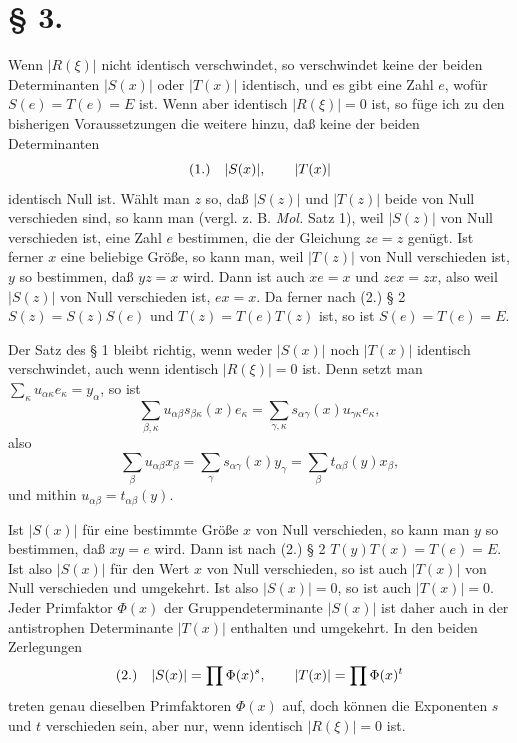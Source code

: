 \documentclass[11pt]{article}
\newcommand{\fnum}[1]{\textup{(\ensuremath{#1}.)}\quad}
\begin{document}
\section*{§ 3.}

Wenn $|R(\xi)|$ nicht identisch verschwindet, so verschwindet keine der beiden Determinanten $|S(x)|$ oder $|T(x)|$ identisch, und es gibt eine Zahl $e$, wofür $S(e)=T(e)=E$ ist. Wenn aber identisch $|R(\xi)|=0$ ist, so füge ich zu den bisherigen Voraussetzungen die weitere hinzu, daß keine der beiden Determinanten
\[
\fnum{1} |S(x)|,\qquad |T(x)|
\]
identisch Null ist. Wählt man $z$ so, daß $|S(z)|$ und $|T(z)|$ beide von Null verschieden sind, so kann man (vergl. z. B. \emph{Mol.} Satz 1), weil $|S(z)|$ von Null verschieden ist, eine Zahl $e$ bestimmen, die der Gleichung $ze=z$ genügt. Ist ferner $x$ eine beliebige Größe, so kann man, weil $|T(z)|$ von Null verschieden ist, $y$ so bestimmen, daß $yz=x$ wird. Dann ist auch $xe=x$ und $zex=zx$, also weil $|S(z)|$ von Null verschieden ist, $ex=x$. Da ferner nach (2.) § 2 $S(z)=S(z)S(e)$ und $T(z)=T(e)T(z)$ ist, so ist $S(e)=T(e)=E$.

Der Satz des § 1 bleibt richtig, wenn weder $|S(x)|$ noch $|T(x)|$ identisch verschwindet, auch wenn identisch $|R(\xi)|=0$ ist. Denn setzt man $\sum_\kappa u_{\alpha\kappa}e_\kappa=y_\alpha$, so ist
\[
 \sum_{\beta,\kappa}u_{\alpha\beta}s_{\beta\kappa}(x)e_\kappa
 =\sum_{\gamma,\kappa}s_{\alpha\gamma}(x)u_{\gamma\kappa}e_\kappa,
\]
also
\[
 \sum_\beta u_{\alpha\beta}x_\beta=\sum_\gamma s_{\alpha\gamma}(x)y_\gamma=\sum_\beta t_{\alpha\beta}(y)x_\beta,
\]
und mithin $u_{\alpha\beta}=t_{\alpha\beta}(y)$.

Ist $|S(x)|$ für eine bestimmte Größe $x$ von Null verschieden, so kann man $y$ so bestimmen, daß $xy=e$ wird. Dann ist nach (2.) § 2 $T(y)T(x)=T(e)=E$. Ist also $|S(x)|$ für den Wert $x$ von Null verschieden, so ist auch $|T(x)|$ von Null verschieden und umgekehrt. Ist also $|S(x)|=0$, so ist auch $|T(x)|=0$. Jeder Primfaktor $\Phi(x)$ der Gruppendeterminante $|S(x)|$ ist daher auch in der antistrophen Determinante $|T(x)|$ enthalten und umgekehrt. In den beiden Zerlegungen
\[
\fnum{2} |S(x)|=\prod \Phi(x)^s,\qquad |T(x)|=\prod \Phi(x)^t
\]
treten genau dieselben Primfaktoren $\Phi(x)$ auf, doch können die Exponenten $s$ und $t$ verschieden sein, aber nur, wenn identisch $|R(\xi)|=0$ ist.
\end{document}
